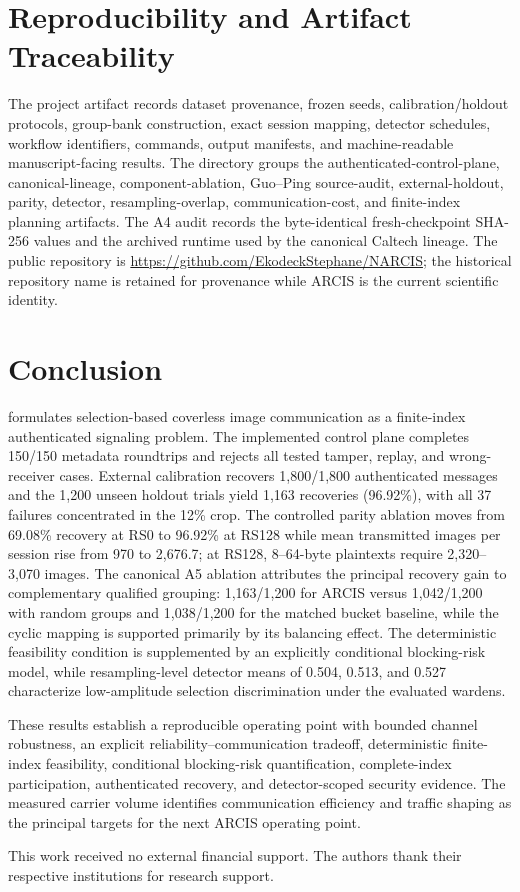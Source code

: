 \section{Reproducibility and Artifact Traceability}
The project artifact records dataset provenance, frozen seeds, calibration/holdout protocols, group-bank construction, exact session mapping, detector schedules, workflow identifiers, commands, output manifests, and machine-readable manuscript-facing results. The  directory groups the authenticated-control-plane, canonical-lineage, component-ablation, Guo--Ping source-audit, external-holdout, parity, detector, resampling-overlap, communication-cost, and finite-index planning artifacts. The A4 audit records the byte-identical fresh-checkpoint SHA-256 values and the archived runtime used by the canonical Caltech lineage. The public repository is \url{https://github.com/EkodeckStephane/NARCIS}; the historical repository name is retained for provenance while ARCIS is the current scientific identity.

\section{Conclusion}
\method formulates selection-based coverless image communication as a finite-index authenticated signaling problem. The implemented control plane completes 150/150 metadata roundtrips and rejects all tested tamper, replay, and wrong-receiver cases. External calibration recovers 1,800/1,800 authenticated messages and the 1,200 unseen holdout trials yield 1,163 recoveries (96.92\%), with all 37 failures concentrated in the 12\% crop. The controlled parity ablation moves from 69.08\% recovery at RS0 to 96.92\% at RS128 while mean transmitted images per session rise from 970 to 2,676.7; at RS128, 8--64-byte plaintexts require 2,320--3,070 images. The canonical A5 ablation attributes the principal recovery gain to complementary qualified grouping: 1,163/1,200 for ARCIS versus 1,042/1,200 with random groups and 1,038/1,200 for the matched bucket baseline, while the cyclic mapping is supported primarily by its balancing effect. The deterministic feasibility condition is supplemented by an explicitly conditional blocking-risk model, while resampling-level detector means of 0.504, 0.513, and 0.527 characterize low-amplitude selection discrimination under the evaluated wardens.

These results establish a reproducible operating point with bounded channel robustness, an explicit reliability--communication tradeoff, deterministic finite-index feasibility, conditional blocking-risk quantification, complete-index participation, authenticated recovery, and detector-scoped security evidence. The measured carrier volume identifies communication efficiency and traffic shaping as the principal targets for the next ARCIS operating point.

\begin{acks}
This work received no external financial support. The authors thank their respective institutions for research support.
\end{acks}





